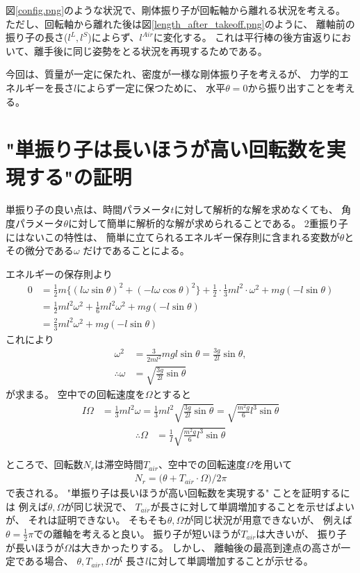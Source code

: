 \documentclass[a4paper,11pt]{jsarticle}
\begin{document}
図\ref{config.png}のような状況で、剛体振り子が回転軸から離れる状況を考える。
ただし、回転軸から離れた後は図\ref{length_after_takeoff.png}のように、
離軸前の振り子の長さ($l^L, l^S$)によらず、$l^{Air}$に変化する。
これは平行棒の後方宙返りにおいて、離手後に同じ姿勢をとる状況を再現するためである。

今回は、質量が一定に保たれ、密度が一様な剛体振り子を考えるが、
力学的エネルギーを長さ$l$によらず一定に保つために、
水平$\theta = 0$から振り出すことを考える。

\section{"単振り子は長いほうが高い回転数を実現する"の証明}

単振り子の良い点は、時間パラメータ$t$に対して解析的な解を求めなくても、
角度パラメータ$\theta$に対して簡単に解析的な解が求められることである。
2重振り子にはないこの特性は、
簡単に立てられるエネルギー保存則に含まれる変数が$\theta$とその微分である$\omega$
だけであることによる。

エネルギーの保存則より
\begin{align}
  0 
  &= \frac{1}{2} m \Big\{ (l\omega\sin\theta)^2 + (-l\omega\cos\theta)^2  \Big\}
  + \frac{1}{2} \cdot \frac{1}{3} ml^2 \cdot \omega^2
  + mg (-l \sin\theta )
  \\
  &= \frac{1}{2}ml^2\omega^2 + \frac{1}{6}ml^2\omega^2 + mg (-l\sin\theta)
  \\
  &= \frac{2}{3}ml^2\omega^2 + mg (-l\sin\theta)
\end{align}
これにより
\begin{align}
  \omega^2 &= \frac{3}{2ml^2}mgl\sin\theta = \frac{3g}{2l}\sin\theta,
  \\
  \therefore
  \omega &= \sqrt{ \frac{3g}{2l}\sin\theta }
\end{align}
が求まる。
空中での回転速度を$\Omega$とすると
\begin{align}
  I\Omega 
  &= \frac{1}{3}ml^2\omega
  = \frac{1}{3}ml^2 \sqrt{ \frac{3g}{2l}\sin\theta }
  = \sqrt{ \frac{m^2 g}{6} l^3 \sin\theta }
\end{align}
\begin{align}
  \therefore \Omega
  &= \frac{1}{I} \sqrt{ \frac{m^2 g}{6} l^3 \sin\theta }
  \label{eq:Omega}
\end{align}

ところで、回転数$N_r$は滞空時間$T_{air}$、空中での回転速度$\Omega$を用いて
\begin{align}
  N_r = \Big( \theta + T_{air} \cdot \Omega \Big) / 2\pi
\end{align}
で表される。
"単振り子は長いほうが高い回転数を実現する"
ことを証明するには
例えば$\theta, \Omega$が同じ状況で、
$T_{air}$が長さに対して単調増加することを示せばよいが、
それは証明できない。
そもそも$\theta, \Omega$が同じ状況が用意できないが、
例えば$\theta=\frac{1}{2}\pi$での離軸を考えると良い。
振り子が短いほうが$T_{air}$は大きいが、
振り子が長いほうが$\Omega$は大きかったりする。
しかし、
離軸後の最高到達点の高さが一定である場合、
$\theta, T_{air}, \Omega$が
長さ$l$に対して単調増加することが示せる。
\end{document}
